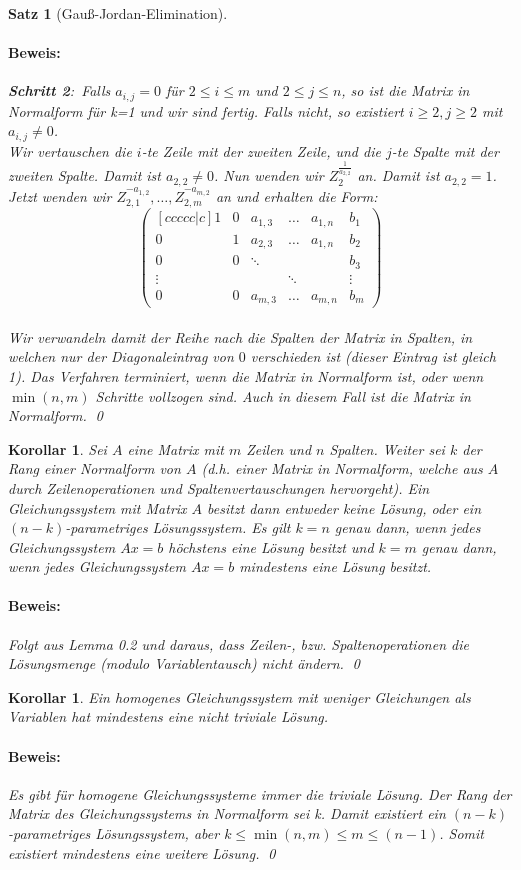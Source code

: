 \documentclass{report}
\theoremstyle{customrem}
\theoremstyle{customdef}
\newtheorem{korrolar}[definition]{Korollar}
\newtheorem{satz}[definition]{Satz}
\renewenvironment{proof}{\paragraph{Beweis: }}{\qed}
\begin{document}
\begin{satz}[Gauß-Jordan-Elimination]
\begin{proof}
			\textbf{Schritt 2}:\ Falls $a_{i,j} = 0$ für $2 \le i \le m$ und $2 \le j \le n$, so ist die Matrix in Normalform für k=1 und wir sind fertig. Falls nicht, so existiert $i \ge 2, j\ge 2$ mit $a_{i,j} \neq 0$.\\
			Wir vertauschen die $i$-te Zeile mit der zweiten Zeile, und die $j$-te Spalte mit der zweiten Spalte. Damit ist $a_{2,2} \neq 0$. Nun wenden wir $Z_{2}^{\frac{1}{a_{2,2}}}$ an. Damit ist $a_{2,2} = 1$. Jetzt wenden wir $Z_{2,1}^{-a_{1,2}}, \dots, Z_{2,m}^{-a_{m,2}}$ an und erhalten die Form:
			$$
			\begin{pmatrix}[ccccc|c]
			1 & 0 & a_{1, 3} & \dots & a_{1, n} & b_1\\
			0 & 1 & a_{2, 3} & \dots & a_{1, n} & b_2\\
			0 & 0 & \ddots	 &		 & 			& b_3\\
			\vdots&&		 & \ddots&			& \vdots\\
			0 & 0 & a_{m, 3} & \dots & a_{m, n} & b_m
			\end{pmatrix}
			$$\\
			Wir verwandeln damit der Reihe nach die Spalten der Matrix in Spalten, in welchen nur der Diagonaleintrag von $0$ verschieden ist (dieser Eintrag ist gleich 1).
			Das Verfahren terminiert, wenn die Matrix in Normalform ist, oder wenn $\min(n, m)$ Schritte vollzogen sind. Auch in diesem Fall ist die Matrix in Normalform.
		\end{proof}
	\end{satz}
	\vspace{.2cm}
	\begin{korrolar}
		Sei $A$ eine Matrix mit $m$ Zeilen und $n$ Spalten. Weiter sei $k$ der Rang einer Normalform von $A$ (d.h. einer Matrix in Normalform, welche aus $A$ durch Zeilenoperationen und Spaltenvertauschungen hervorgeht). Ein Gleichungssystem  mit Matrix $A$ besitzt dann entweder keine Lösung, oder ein $(n-k)$-parametriges Lösungssystem. Es gilt $k=n$ genau dann, wenn jedes Gleichungssystem $Ax=b$ höchstens eine Lösung besitzt und $k=m$ genau dann, wenn jedes Gleichungssystem $Ax=b$ mindestens eine Lösung besitzt.\\
		\begin{proof}
			Folgt aus Lemma 0.2 und daraus, dass Zeilen-, bzw. Spaltenoperationen die Lösungsmenge (modulo Variablentausch) nicht ändern.
		\end{proof}
	\end{korrolar}
	\vspace{.2cm}
	\begin{korrolar}
		\label{kor5}
		Ein homogenes Gleichungssystem mit weniger Gleichungen als Variablen hat mindestens eine nicht triviale Lösung.\\
		\begin{proof}
			Es gibt für homogene Gleichungssysteme immer die triviale Lösung. Der Rang der Matrix des Gleichungssystems in Normalform sei k. Damit existiert ein $(n-k)$-parametriges Lösungssystem, aber $k \le \min(n, m) \le m \le (n-1)$. Somit existiert mindestens eine weitere Lösung.
		\end{proof}
	\end{korrolar}
\end{document}
